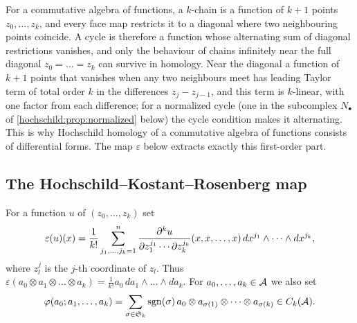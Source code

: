 \begin{discussion}
For a commutative algebra of functions, a $k$-chain is a function of $k+1$
points $z_0,\dots,z_k$, and every face map restricts it to a diagonal where
two neighbouring points coincide. A cycle is therefore a function whose
alternating sum of diagonal restrictions vanishes, and only the behaviour of
chains infinitely near the full diagonal $z_0=\dots=z_k$ can survive in
homology. Near the diagonal a function of $k+1$ points that vanishes when
any two neighbours meet has leading Taylor term of total order $k$ in the
differences $z_j-z_{j-1}$, and this term is $k$-linear, with one factor from
each difference; for a normalized cycle (one in the subcomplex $N_\bullet$ of
\cref{hochschild:prop:normalized} below) the cycle condition makes it
alternating.
This is why Hochschild homology of a commutative algebra of functions
consists of differential forms. The map $\varepsilon$ below extracts
exactly this first-order part.
\end{discussion}

\subsection{The Hochschild--Kostant--Rosenberg map}
For a function $u$ of $(z_0,\dots,z_k)$ set
\begin{equation}
  \varepsilon(u)(x)=\frac1{k!}\sum_{j_1,\dots,j_k=1}^n
  \frac{\partial^ku}{\partial z_1^{j_1}\cdots\partial z_k^{j_k}}(x,x,\dots,x)\,
  dx^{j_1}\wedge\dots\wedge dx^{j_k},
  \label{hochschild:eq:HKR}
\end{equation}
where $z_l^{j}$ is the $j$-th coordinate of $z_l$. Thus
$\varepsilon(a_0\otimes a_1\otimes\dots\otimes a_k)=\frac1{k!}a_0\,da_1\wedge\dots\wedge da_k$.
For $a_0,\dots,a_k\in\mathcal{A}$ we also set
\begin{equation}
  \varphi(a_0;a_1,\dots,a_k)=\sum_{\sigma\in\mathfrak S_k}\operatorname{sgn}(\sigma)\,
  a_0\otimes a_{\sigma(1)}\otimes\dots\otimes a_{\sigma(k)}\in C_k(\mathcal{A}).
  \label{hochschild:eq:antisym}
\end{equation}

